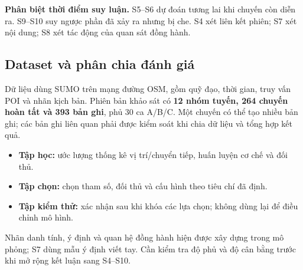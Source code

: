 \documentclass[10pt,a4paper]{article}
\begin{document}
\textbf{Phân biệt thời điểm suy luận.} S5--S6 dự đoán tương lai khi chuyến còn diễn ra. S9--S10 suy ngược phần đã xảy ra nhưng bị che. S4 xét liên kết phiên; S7 xét nội dung; S8 xét tác động của quan sát đồng hành.

\subsection{Dataset và phân chia đánh giá}
Dữ liệu dùng SUMO trên mạng đường OSM, gồm quỹ đạo, thời gian, truy vấn POI và nhãn kịch bản. Phiên bản khảo sát có \textbf{12 nhóm tuyến, 264 chuyến hoàn tất và 393 bản ghi}, phủ 30 ca A/B/C. Một chuyến có thể tạo nhiều bản ghi; các bản ghi liên quan phải được kiểm soát khi chia dữ liệu và tổng hợp kết quả.

\begin{itemize}
\item \textbf{Tập học:} ước lượng thống kê vị trí/chuyển tiếp, huấn luyện cơ chế và đối thủ.
\item \textbf{Tập chọn:} chọn tham số, đối thủ và cấu hình theo tiêu chí đã định.
\item \textbf{Tập kiểm thử:} xác nhận sau khi khóa các lựa chọn; không dùng lại để điều chỉnh mô hình.
\end{itemize}
Nhãn danh tính, ý định và quan hệ đồng hành hiện được xây dựng trong mô phỏng; S7 dùng mẫu ý định viết tay. Cần kiểm tra độ phủ và độ cân bằng trước khi mở rộng kết luận sang S4--S10.

\newpage
\end{document}
